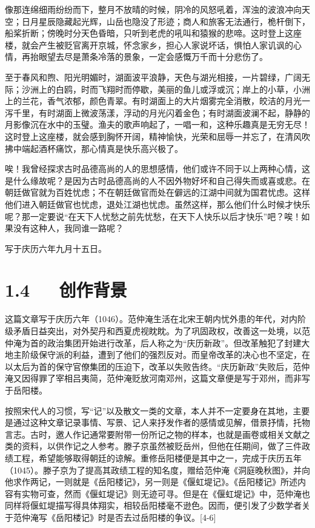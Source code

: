 \documentclass[letterpaper,10pt,english]{sphinxmanual}
\begin{document}
像那连绵细雨纷纷而下，整月不放晴的时候，阴冷的风怒吼着，浑浊的波浪冲向天空；日月星辰隐藏起光辉，山岳也隐没了形迹；商人和旅客无法通行，桅杆倒下，船桨折断；傍晚时分天色昏暗，只听到老虎的吼叫和猿猴的悲啼。这时登上这座楼，就会产生被贬官离开京城，怀念家乡，担心人家说坏话，惧怕人家讥讽的心情，再抬眼望去尽是萧条冷落的景象，一定会感慨万千而十分悲伤了。

至于春风和煦、阳光明媚时，湖面波平浪静，天色与湖光相接，一片碧绿，广阔无际；沙洲上的白鸥，时而飞翔时而停歇，美丽的鱼儿或浮或沉；岸上的小草，小洲上的兰花，香气浓郁，颜色青翠。有时湖面上的大片烟雾完全消散，皎洁的月光一泻千里，有时湖面上微波荡漾，浮动的月光闪着金色；有时湖面波澜不起，静静的月影像沉在水中的玉璧。渔夫的歌声响起了，一唱一和，这种乐趣真是无穷无尽！这时登上这座楼，就会感到胸怀开阔，精神愉快，光荣和屈辱一并忘了，在清风吹拂中端起酒杯痛饮，那心情真是快乐高兴极了。

唉！我曾经探求古时品德高尚的人的思想感情，他们或许不同于以上两种心情，这是什么缘故呢？是因为古时品德高尚的人不因外物好坏和自己得失而或喜或悲。在朝廷做官就为百姓忧虑；不在朝廷做官而处在僻远的江湖中间就为国君忧虑。这样他们进入朝廷做官也忧虑，退处江湖也忧虑。虽然这样，那么他们什么时候才快乐呢？那一定要说“在天下人忧愁之前先忧愁，在天下人快乐以后才快乐”吧？唉！如果没有这种人，我同谁一路呢？

写于庆历六年九月十五日。


\section{1.4   创作背景}
\label{\detokenize{p01_u6563_u6587/_u8303_u4ef2_u6df9-_u5cb3_u9633_u697c_u8bb0:id6}}
这篇文章写于庆历六年（1046）。范仲淹生活在北宋王朝内忧外患的年代，对内阶级矛盾日益突出，对外契丹和西夏虎视眈眈。为了巩固政权，改善这一处境，以范仲淹为首的政治集团开始进行改革，后人称之为“庆历新政”。但改革触犯了封建大地主阶级保守派的利益，遭到了他们的强烈反对。而皇帝改革的决心也不坚定，在以太后为首的保守官僚集团的压迫下，改革以失败告终。“庆历新政”失败后，范仲淹又因得罪了宰相吕夷简，范仲淹贬放河南邓州，这篇文章便是写于邓州，而非写于岳阳楼。

按照宋代人的习惯，写“记”以及散文一类的文章，本人并不一定要身在其地，主要是通过这种文章记录事情、写景、记人来抒发作者的感情或见解，借景抒情，托物言志。古时，邀人作记通常要附带一份所记之物的样本，也就是画卷或相关文献之类的资料，以供作记之人参考。滕子京虽然被贬岳州，但他在任期间，做了三件政绩工程，希望能够取得朝廷的谅解。重修岳阳楼便是其中之一，完成于庆历五年（1045）。滕子京为了提高其政绩工程的知名度，赠给范仲淹《洞庭晚秋图》，并向他求作两记，一则就是《岳阳楼记》，另一则是《偃虹堤记》。《岳阳楼记》所述内容有实物可查，然而《偃虹堤记》则无迹可寻。但是在《偃虹堤记》中，范仲淹也同样将偃虹堤描写得具体翔实，相较岳阳楼毫不逊色。因而，便引发了少数学者关于范仲淹写《岳阳楼记》时是否去过岳阳楼的争议。{[}4-6{]}
\end{document}

